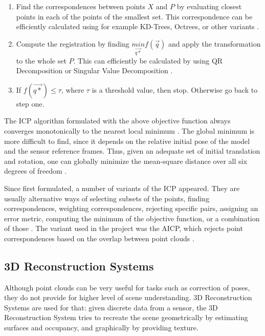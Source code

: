 \documentclass[12pt]{article}
\begin{document}
\begin{enumerate}[leftmargin=.8in]
\item Find the correspondences between points $X$ and $P$ by evaluating closest points in each of the points of the smallest set. This correspondence can be efficiently calculated using for example KD-Trees, Octrees, or other variants \cite{KDT}.
\item Compute the registration by finding $\underset{\overrightarrow{q*}}{min}f(\overrightarrow{q})$ and apply the transformation to the whole set $P$. This can efficiently be calculated by using QR Decomposition or Singular Value Decomposition \cite{ICPVariants}.
\item If $f(\overrightarrow{q*}) \leq \tau$, where $\tau$ is a threshold value, then stop. Otherwise go back to step one.
\end{enumerate}	
	
The ICP algorithm formulated with the above objective function always converges monotonically to the nearest local minimum \cite{AMethodRegistration}. The global minimum is more difficult to find, since it depends on the relative initial pose of the model and the sensor reference frames. Thus, given an adequate set of initial translation and rotation, one can globally minimize the mean-square distance over all six degrees of freedom \cite{AMethodRegistration}.

Since first formulated, a number of variants of the ICP appeared. They are usually alternative ways of selecting subsets of the points, finding correspondences, weighting correspondences, rejecting specific pairs, assigning an error metric, computing the minimum of the objective function, or a combination of those \cite{ICPVariants}. The variant used in the project was the AICP, which rejects point correspondences based on the overlap between point clouds \cite{7989547}.
	
	\subsection{3D Reconstruction Systems}

Although point clouds can be very useful for tasks such as correction of poses, they do not provide for higher level of scene understanding. 3D Reconstruction Systems are used for that: given discrete data from a sensor, the 3D Reconstruction System tries to recreate the scene geometrically by estimating surfaces and occupancy, and graphically by providing texture.
	
\end{document}
